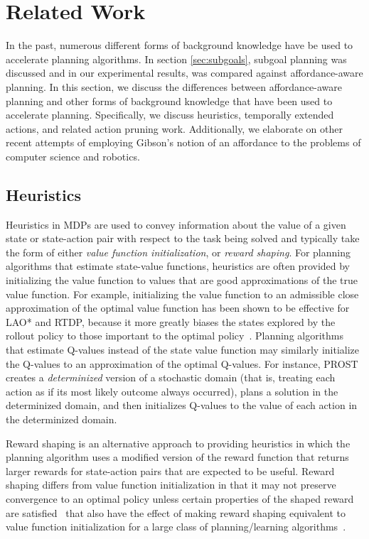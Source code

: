 \documentclass[]{article}
\begin{document}
\section{Related Work}
In the past, numerous different forms of background knowledge have be used to 
accelerate planning algorithms. In section \ref{sec:subgoals}, subgoal
planning was discussed and in our experimental results, was compared against affordance-aware planning. 
In this section, we discuss the differences between affordance-aware planning and other
forms of background knowledge that have been used to accelerate planning.
Specifically, we discuss heuristics, temporally extended actions, and related action pruning work.
Additionally, we elaborate on other recent attempts of employing Gibson's notion of an affordance 
to the problems of computer science and robotics.


\subsection{Heuristics}
Heuristics in MDPs are used to convey information about the value of a given state or state-action pair with respect to the task being solved and typically take the form of either {\em value function initialization},
or {\em reward shaping}. For planning algorithms that estimate state-value functions, heuristics are often
provided by initializing the value function to values that are good approximations of the true value function. For example, initializing the value function to an admissible close approximation of the optimal value function has been shown to be effective for LAO* and RTDP, because it more greatly biases the states explored by the rollout policy to those important to the optimal policy~\cite{Hansen:1999qf}. Planning algorithms that estimate Q-values instead of the state value function may similarly initialize the Q-values to an approximation of the optimal Q-values. For instance, PROST~\cite{keller2012prost} creates a {\em determinized} version of a stochastic domain (that is, treating each action as if its most likely outcome always occurred), plans a solution in the determinized domain, and then initializes Q-values to the value of each action in the determinized domain.

Reward shaping is an alternative approach to providing heuristics in which the planning algorithm uses a modified version of the reward function that returns larger rewards for state-action pairs that are expected to be useful. Reward shaping differs from value function initialization in that it may not preserve convergence to an optimal policy unless certain properties of the shaped reward are satisfied~\cite{potshap} that also have the effect of making reward shaping equivalent to value function initialization for a large class of planning/learning algorithms~\cite{Wiewiora:2003fk}.
\end{document}
